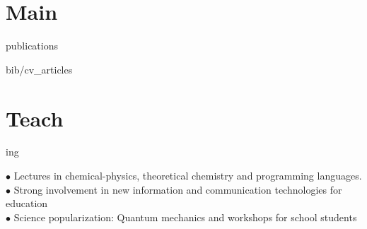 \documentclass{cv-style}     %
\begin{document}
\vspace{-6mm}
\section{Main}{ publications}
\vspace{-0.2cm}
\nocite{villegas_molecular_2020, sabalot-cuzzubbo_relating_2020, aqturin2017_2, guille2015, Martin2012}
\begin{btSect}{bib/cv_articles}
    \setlength{\bibsep}{2pt}
    \btPrintCited
\end{btSect}


%

\vspace{-1mm}
\section{Teach}{ing}
  \vspace{-0.3cm}

$\bullet$ Lectures in chemical-physics, theoretical chemistry and programming languages.\\
$\bullet$ Strong involvement in new information and communication technologies for education\\
$\bullet$ Science popularization: Quantum mechanics and workshops for school students
\end{document}
